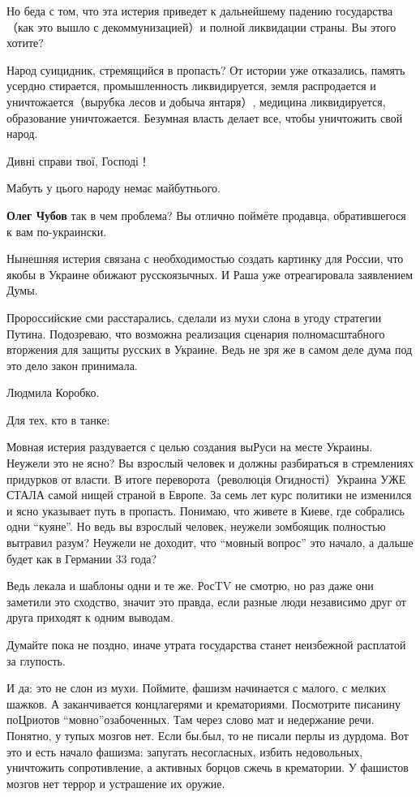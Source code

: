 \begin{itemize}
\begin{itemize}
Но беда с том, что эта истерия приведет к дальнейшему падению государства（как
это вышло с декоммунизацией）и полной ликвидации страны. Вы этого хотите?

Народ суицидник, стремящийся в пропасть? От истории уже отказались, память
усердно стирается, промышленность ликвидируется, земля распродается и
уничтожается（вырубка лесов и добыча янтаря）, медицина ликвидируется,
образование уничтожается. Безумная власть делает все, чтобы уничтожить свой
народ.

Дивні справи твої, Господі！

Мабуть у цього народу немає майбутнього.

\textbf{Олег Чубов} так в чем проблема? Вы отлично поймёте продавца, обратившегося к вам по-украински.

Нынешняя истерия связана с необходимостью создать картинку для России, что
якобы в Украине обижают русскоязычных. И Раша уже отреагировала заявлением
Думы.

Пророссийские сми расстарались, сделали из мухи слона в угоду стратегии Путина.
Подозреваю, что возможна реализация сценария полномасштабного вторжения для
защиты русских в Украине. Ведь не зря же в самом деле дума под это дело закон
принимала.

Людмила Коробко.

Для тех, кто в танке:

Мовная истерия раздувается с целью создания выРуси на месте Украины. Неужели
это не ясно? Вы взрослый человек и должны разбираться в стремлениях придурков
от власти. В итоге переворота（революція Огидності）Украина УЖЕ СТАЛА самой
нищей страной в Европе. За семь лет курс политики не изменился и ясно указывает
путь в пропасть. Понимаю, что живете в Киеве, где собрались одни \enquote{куяне}. Но
ведь вы взрослый человек, неужели зомбоящик полностью вытравил разум? Неужели
не доходит, что \enquote{мовный вопрос} это начало, а дальше будет как в Германии 33
года?

Ведь лекала и шаблоны одни и те же. РосTV не смотрю, но раз даже они заметили
это сходство, значит это правда, если разные люди независимо друг от друга
приходят к одним выводам.

Думайте пока не поздно, иначе утрата государства станет неизбежной расплатой за глупость.

И да: это не слон из мухи. Поймите, фашизм начинается с малого, с мелких
шажков. А заканчивается концлагерями и крематориями. Посмотрите писанину
поЦриотов \enquote{мовно}озабоченных. Там через слово мат и недержание речи. Понятно, у
тупых мозгов нет. Если бы.был, то не писали перлы из дурдома. Вот это и есть
начало фашизма: запугать несогласных, избить недовольных, уничтожить
сопротивление, а активных борцов сжечь в крематории. У фашистов мозгов нет
террор и устрашение их оружие.



\end{itemize}
\end{itemize}
